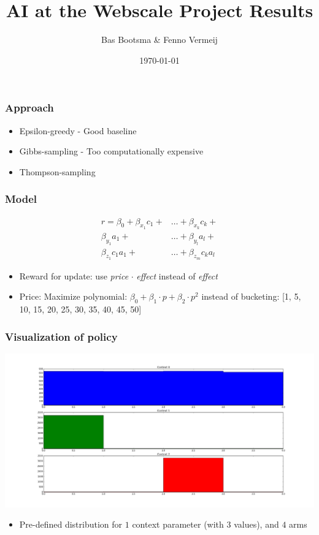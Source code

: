 \documentclass{beamer}
\title[AI@Webscale Presentation]{
  AI at the Webscale Project Results}
\author[Bas Bootsma, Fenno Vermeij]{Bas Bootsma \& Fenno Vermeij}
\institute[Radboud University Nijmegen]{Radboud University Nijmegen}
\date{\today}
\begin{document}
\begin{frame}
  \titlepage
\end{frame}

\begin{frame}
	\frametitle{Approach}	
	\begin{itemize}
		\item Epsilon-greedy - Good baseline
		\item Gibbs-sampling - Too computationally expensive
		\item Thompson-sampling
	\end{itemize}
\end{frame}

\begin{frame}
	\frametitle{Model}
	
		\begin{align*} r = \beta_0 + \beta_{x_1} c_1 + &\ldots + \beta_{x_k} c_k + \\
	    \beta_{y_1} a_1 + &\ldots + \beta_{y_l} a_l + \\
	    \beta_{z_1} c_1a_1 + &\ldots + \beta_{z_m} c_ka_l 
	    \end{align*}
	    \begin{itemize}
		\item  Reward for update: use \emph{price} $\cdot$ \emph{effect} instead of \emph{effect}
		\item  Price: Maximize polynomial: $\beta_0 + \beta_1 \cdot p + \beta_2 \cdot p^2$ instead of bucketing: [1, 5, 10, 15, 20, 25, 30, 35, 40, 45, 50]
	\end{itemize}
\end{frame}

\begin{frame}
	\frametitle{Visualization of policy}
	\includegraphics[width=\textwidth]{test.png}
	\begin{itemize}
		\item Pre-defined distribution for $1$ context parameter (with $3$ values), and $4$ arms
	\end{itemize}
\end{frame}
\end{document}
